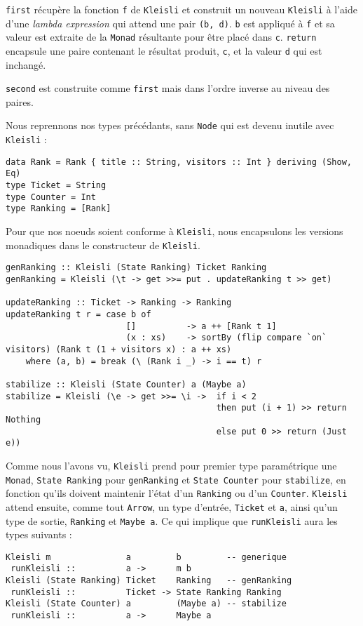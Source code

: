 \documentclass{llncs}
\begin{document}
\lstinline{first} récupère la fonction \lstinline{f} de \lstinline{Kleisli} et
construit un nouveau \lstinline{Kleisli} à l'aide d'une \emph{lambda expression}
qui attend une pair \lstinline{(b, d)}.
\lstinline{b} est appliqué à \lstinline{f} et sa valeur est extraite de la
\lstinline{Monad} résultante pour être placé dans \lstinline{c}.
\lstinline{return} encapsule une paire contenant le résultat produit,
\lstinline{c}, et la valeur \lstinline{d} qui est inchangé.

\lstinline{second} est construite comme \lstinline{first} mais dans l'ordre inverse
au niveau des paires.

Nous reprennons nos types précédants, sans \lstinline{Node} qui est devenu
inutile avec \lstinline{Kleisli} :
\begin{lstlisting}
data Rank = Rank { title :: String, visitors :: Int } deriving (Show, Eq)
type Ticket = String
type Counter = Int
type Ranking = [Rank]
\end{lstlisting}

Pour que nos noeuds soient conforme à \lstinline{Kleisli}, nous encapsulons les
versions monadiques dans le constructeur de \lstinline{Kleisli}.
\begin{lstlisting}
genRanking :: Kleisli (State Ranking) Ticket Ranking
genRanking = Kleisli (\t -> get >>= put . updateRanking t >> get)

updateRanking :: Ticket -> Ranking -> Ranking
updateRanking t r = case b of
                        []          -> a ++ [Rank t 1]
                        (x : xs)    -> sortBy (flip compare `on` visitors) (Rank t (1 + visitors x) : a ++ xs)
    where (a, b) = break (\ (Rank i _) -> i == t) r

stabilize :: Kleisli (State Counter) a (Maybe a)
stabilize = Kleisli (\e -> get >>= \i ->  if i < 2
                                          then put (i + 1) >> return Nothing
                                          else put 0 >> return (Just e))
\end{lstlisting}
Comme nous l'avons vu, \lstinline{Kleisli} prend pour premier type paramétrique
une \lstinline{Monad}, \lstinline{State Ranking} pour \lstinline{genRanking} et
\lstinline{State Counter} pour \lstinline{stabilize}, en fonction qu'ils doivent
maintenir l'état d'un \lstinline{Ranking} ou d'un \lstinline{Counter}.
\lstinline{Kleisli} attend ensuite, comme tout \lstinline{Arrow}, un type d'entrée,
\lstinline{Ticket} et \lstinline{a}, ainsi qu'un type de sortie, \lstinline{Ranking}
et \lstinline{Maybe a}.
Ce qui implique que \lstinline{runKleisli} aura les types suivants :
\begin{lstlisting}
Kleisli m               a         b         -- generique
 runKleisli ::          a ->      m b
Kleisli (State Ranking) Ticket    Ranking   -- genRanking
 runKleisli ::          Ticket -> State Ranking Ranking
Kleisli (State Counter) a         (Maybe a) -- stabilize
 runKleisli ::          a ->      Maybe a
\end{lstlisting}
\end{document}
